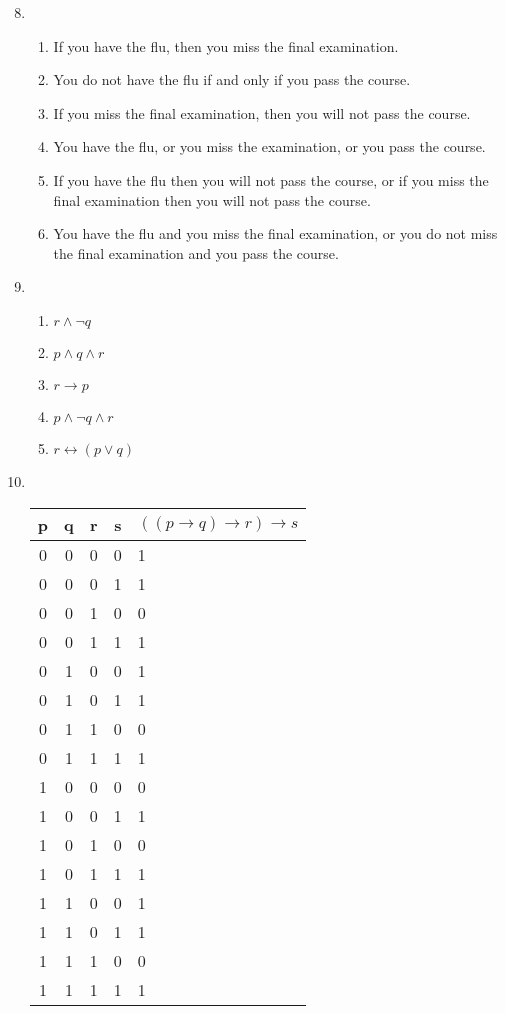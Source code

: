 \documentclass[11pt,a4paper,oneside]{article}
\begin{document}
\begin{enumerate}
\setcounter{enumi}{7}
\item %
\begin{enumerate}
\item If you have the flu, then you miss the final examination.
\item You do not have the flu if and only if you pass the course.
\item If you miss the final examination, then you will not pass the course.
\item You have the flu, or you miss the examination, or you pass the course.
\item If you have the flu then you will not pass the course, or if you miss the final examination then you will not pass the course.
\item You have the flu and you miss the final examination, or you do not miss the final examination and you pass the course.
\end{enumerate}

\setcounter{enumi}{9}
\item %
\begin{enumerate}
\item \( r \wedge \neg q \)
\item \( p \wedge q \wedge r \)
\item \( r \rightarrow p \)
\item \( p \wedge \neg q \wedge r \)
\item \( r \leftrightarrow ( p \vee q ) \)
\end{enumerate}

\setcounter{enumi}{33}
\item %
\hfill \\ %
\begin{center}
\begin{tabular}{c | c | c | c | l}
  p & q & r & s & \( ((p\rightarrow q)\rightarrow r)\rightarrow s\) \\
  \hline
  0 & 0 & 0 & 0 & 1 \\
  0 & 0 & 0 & 1 & 1 \\
  0 & 0 & 1 & 0 & 0 \\
  0 & 0 & 1 & 1 & 1 \\
  0 & 1 & 0 & 0 & 1 \\
  0 & 1 & 0 & 1 & 1 \\
  0 & 1 & 1 & 0 & 0 \\
  0 & 1 & 1 & 1 & 1 \\
  1 & 0 & 0 & 0 & 0 \\
  1 & 0 & 0 & 1 & 1 \\
  1 & 0 & 1 & 0 & 0 \\
  1 & 0 & 1 & 1 & 1 \\
  1 & 1 & 0 & 0 & 1 \\
  1 & 1 & 0 & 1 & 1 \\
  1 & 1 & 1 & 0 & 0 \\
  1 & 1 & 1 & 1 & 1 \\


\end{tabular}
\end{center}
\end{enumerate}
\end{document}
